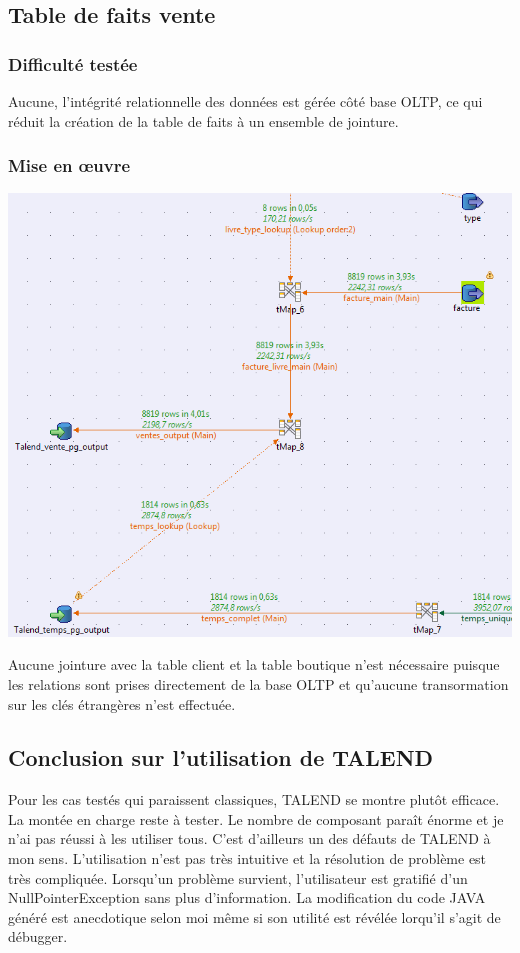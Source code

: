 \subsection{Table de faits vente}
\subsubsection{Difficulté testée}
Aucune, l'intégrité relationnelle des données est gérée côté base OLTP, ce qui réduit la création de la table de faits à un ensemble de jointure.
\subsubsection{Mise en œuvre}
\includegraphics[scale=0.70]{images/table_faits_vente.PNG}

Aucune jointure avec la table client et la table boutique n'est nécessaire puisque les relations sont prises directement de la base OLTP et qu'aucune transormation sur les clés étrangères n'est effectuée.

\subsection{Conclusion sur l'utilisation de TALEND}
Pour les cas testés qui paraissent classiques, TALEND se montre plutôt efficace. La montée en charge reste à tester. Le nombre de composant paraît énorme et je n'ai pas réussi à les utiliser tous. C'est d'ailleurs un des défauts de TALEND à mon sens. L'utilisation n'est pas très intuitive et la résolution de problème est très compliquée. Lorsqu'un problème survient, l'utilisateur est gratifié d'un NullPointerException sans plus d'information. La modification du code JAVA généré est anecdotique selon moi même si son utilité est révélée lorqu'il s'agit de débugger. 
 
\clearpage